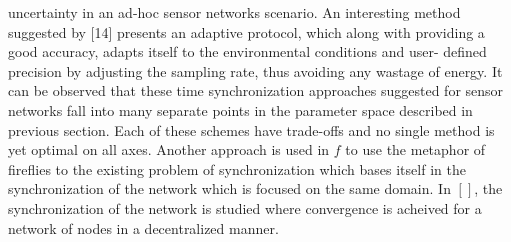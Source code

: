 \documentclass[a4paper,8pt]{report}
\begin{document}
uncertainty in an ad-hoc sensor networks scenario.
      An interesting method suggested by [14] presents an adaptive
protocol, which along with providing a good accuracy, adapts itself
to the environmental conditions and user- defined precision by adjusting
the sampling rate, thus avoiding any wastage of energy.
      It can be observed that these time synchronization approaches
suggested for sensor networks fall into many separate points in the parameter space
described in previous section. Each of these schemes have trade-offs
and no single method is yet optimal on all axes. Another approach is
used in $f$ to use the metaphor of fireflies to the existing problem
of synchronization which bases itself in the synchronization of the
network which is focused on the same domain. \newline In $[]$, the
synchronization of the network is studied where convergence is
acheived for a network of nodes in a decentralized manner.
\end{document}
